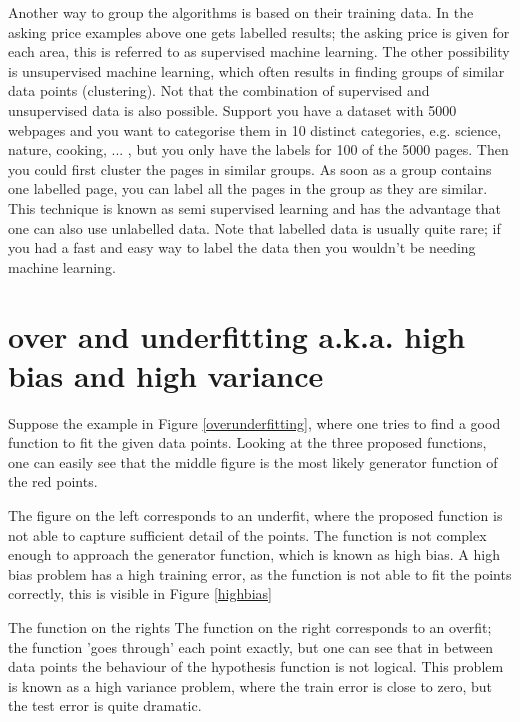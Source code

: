 \npar

Another way to group the algorithms is based on their training data. In the asking price examples above one gets labelled results; the asking price is given for each area, this is referred to as supervised machine learning. The other possibility is unsupervised machine learning, which often results in finding groups of similar data points (clustering). Not that the combination of supervised and unsupervised data is also possible. Support you have a dataset with 5000 webpages and you want to categorise them in 10 distinct categories, e.g. science, nature, cooking, ... , but you only have the labels for 100 of the 5000 pages. Then you could first cluster the pages in similar groups. As soon as a group contains one labelled page, you can label all the pages in the group as they are similar. This technique is known as semi supervised learning and has the advantage that one can also use unlabelled data. Note that labelled data is usually quite rare; if you had a fast and easy way to label the data then you wouldn't be needing machine learning.

\section{over and underfitting a.k.a. high bias and high variance}



Suppose the example in Figure \ref{overunderfitting}, where one tries to find a good function to fit the given data points. Looking at the three proposed functions, one can easily see that the middle figure is the most likely generator function of the red points. 

The figure on the left corresponds to an underfit, where the proposed function is not able to capture sufficient detail of the points. The function is not complex enough to approach the generator function, which is known as high bias. A high bias problem has a high training error, as the function is not able to fit the points correctly, this is visible in Figure \ref{highbias}


The function on the rights The function on the right corresponds to an overfit; the function 'goes through' each point exactly, but one can see that in between data points the behaviour of the hypothesis function is not logical. This problem is known as a high variance problem, where the train error is close to zero, but the test error is quite dramatic. 

